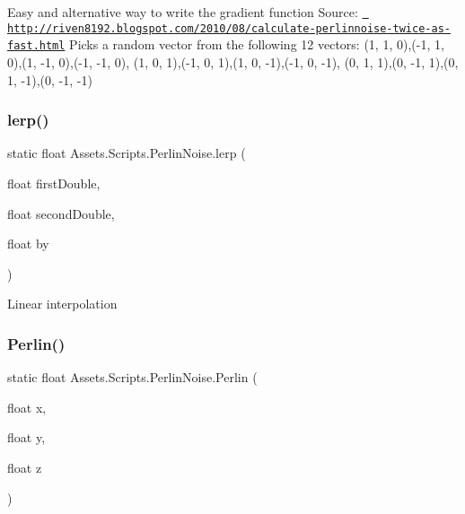 Easy and alternative way to write the gradient function Source\+: \href{http://riven8192.blogspot.com/2010/08/calculate-perlinnoise-twice-as-fast.html}{\texttt{ http\+://riven8192.\+blogspot.\+com/2010/08/calculate-\/perlinnoise-\/twice-\/as-\/fast.\+html}} Picks a random vector from the following 12 vectors\+: (1, 1, 0),(-\/1, 1, 0),(1, -\/1, 0),(-\/1, -\/1, 0), (1, 0, 1),(-\/1, 0, 1),(1, 0, -\/1),(-\/1, 0, -\/1), (0, 1, 1),(0, -\/1, 1),(0, 1, -\/1),(0, -\/1, -\/1) 

\mbox{\label{class_assets_1_1_scripts_1_1_perlin_noise_a0a9585c89676dbed37137fc71b11fec7}} 
\subsubsection{\texorpdfstring{lerp()}{lerp()}}
{\footnotesize\ttfamily static float Assets.\+Scripts.\+Perlin\+Noise.\+lerp (\begin{DoxyParamCaption}\item[{float}]{first\+Double,  }\item[{float}]{second\+Double,  }\item[{float}]{by }\end{DoxyParamCaption})\hspace{0.3cm}{\ttfamily [static]}}



Linear interpolation 

\mbox{\label{class_assets_1_1_scripts_1_1_perlin_noise_a126a47fd87c2c24d18a906ac6c60c1a4}} 
\subsubsection{\texorpdfstring{Perlin()}{Perlin()}}
{\footnotesize\ttfamily static float Assets.\+Scripts.\+Perlin\+Noise.\+Perlin (\begin{DoxyParamCaption}\item[{float}]{x,  }\item[{float}]{y,  }\item[{float}]{z }\end{DoxyParamCaption})\hspace{0.3cm}{\ttfamily [static]}}



